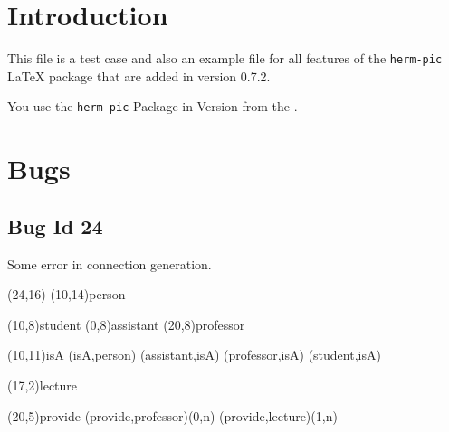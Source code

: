 \documentclass[a4paper,11pt]{article}
\begin{document}
\section{Introduction}

This file is a test case and also an example file for all features of
the {\tt herm-pic} LaTeX package that are added in version 0.7.2.

You use the {\tt herm-pic} Package in Version \HPlongrevision{} from the \HPdate.

\section{Bugs}

\subsection{Bug Id 24}

Some error in connection generation.

\begin{schema}(24,16)                                                           
  \entity(10,14){person}                                                    
                                                                                
  \entity(10,8){student}                                                    
  \entity(0,8){assistant}                                                 
  \entity(20,8){professor}                                                  
                                                                                
  \relation(10,11){isA}                                                     
  \conn(isA,person){}                                                       
  \conn(assistant,isA){}                                                  
  \conn(professor,isA){}                                                    
  \conn(student,isA){}                                                      
                                                                                
  \entity(17,2){lecture}                                          
                                                                                
  \relation(20,5){provide}                                                 
  \conn(provide,professor){(0,n)}                                          
  \conn(provide,lecture){(1,n)}                                           
\end{schema}
\end{document}
